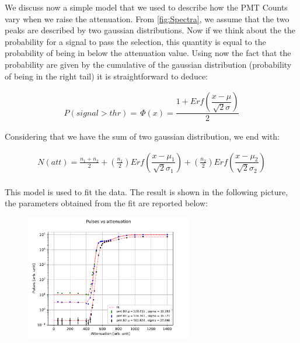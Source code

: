 We discuss now a simple model that we used to describe how the PMT Counts vary when we raise the attenuation. From \ref{fig:Spectra}, we assume that the two peaks are described by two gaussian distributions. Now if we think about the the probability for a signal to pass the selection, this quantity is equal to the probability of being in below the attenuation value. Using now the fact that the probability are given by the cumulative of the gaussian distribution (probability of being in the right tail) it is straightforward to deduce:

\begin{align*}
P(signal > thr) = \, \Phi(x) = \dfrac{1 + Erf(\dfrac{x - \mu}{\sqrt{2} \sigma })}{2}
\end{align*}

Considering that we have the sum of two gaussian distribution, we end with:

\begin{equation} \label{eq:ModelAtt}
\begin{split}
N(att) = \frac{n_{1} + n_{2}}{2} + (\frac{n_{1}}{2}) Erf(\dfrac{x - \mu_{1}}{\sqrt{2} \sigma_{1} })   + (\frac{n_{2}}{2}) Erf(\dfrac{x - \mu_{2}}{\sqrt{2} \sigma_{2}}) \\
\end{split}
\end{equation}

This model is used to fit the data. The result is shown in the following picture, the parameters obtained from the fit are reported below:

\begin{figure}
\centering
\includegraphics[width = 0.65\textwidth ]{Analysis/CalibrationPMT/Fit_attenuation.pdf}
\end{figure}

